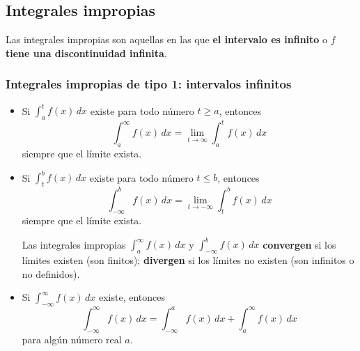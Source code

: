 \documentclass[a4paper,12pt]{article}
\theoremstyle{definition}
\begin{document}
\subsection{Integrales impropias}
Las integrales impropias son aquellas en las que \textbf{el intervalo es infinito} o \textbf{$f$ tiene una discontinuidad infinita}.

\subsubsection{Integrales impropias de tipo 1: \textbf{intervalos infinitos}}
\begin{itemize}
    \item Si $\int_{a}^{t} f(x) \, dx$ existe para todo número $t \geqslant a$, entonces
    \[ \int_{a}^{\infty} f(x) \, dx = \lim_{t \to \infty} \int_{a}^{t} f(x) \, dx \]
    siempre que el límite exista.

    \item Si $\int_{t}^{b} f(x) \, dx$ existe para todo número $t \leqslant b$, entonces
    \[ \int_{-\infty}^{b} f(x) \, dx = \lim_{t \to -\infty} \int_{t}^{b} f(x) \, dx \]
    siempre que el límite exista.

    \begin{tcolorbox}
        Las integrales impropias $\int_{a}^{\infty} f(x) \, dx$ y $\int_{-\infty}^{b} f(x) \, dx$ \textbf{convergen} si los límites existen (son finitos); \textbf{divergen} si los límites no existen (son infinitos o no definidos).
    \end{tcolorbox}

    \item Si $\int_{-\infty}^{\infty} f(x) \, dx$ existe, entonces
    \[ \int_{-\infty}^{\infty} f(x) \, dx = \int_{-\infty}^{a} f(x) \, dx + \int_{a}^{\infty} f(x) \, dx \]
    para algún número real $a$.
\end{itemize}
\end{document}
